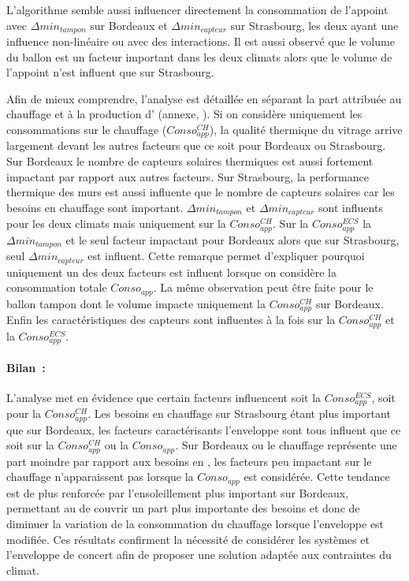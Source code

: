 L’algorithme semble aussi influencer directement la consommation de l’appoint avec
$\Delta min_{tampon}$ sur Bordeaux et $\Delta min_{capteur}$ sur Strasbourg, les deux
ayant une influence non-linéaire ou avec des interactions. Il est aussi observé que
le volume du ballon  est un facteur important dans les deux climats alors
que le volume de l’appoint n’est influent que sur Strasbourg.

Afin de mieux comprendre, l’analyse est détaillée en séparant la part attribuée au
chauffage et à la production d’ (annexe, ). Si on
considère uniquement les consommations sur le chauffage ($Conso_{app}^{CH}$), la qualité
thermique du vitrage arrive largement devant les autres facteurs que ce soit pour Bordeaux
ou Strasbourg. Sur Bordeaux le nombre de capteurs solaires thermiques est aussi fortement
impactant par rapport aux autres facteurs. Sur Strasbourg, la performance thermique des
murs est aussi influente que le nombre de capteurs solaires car les besoins en chauffage
sont important.
$\Delta min_{tampon}$ et $\Delta min_{capteur}$ sont influents pour les deux climats mais
uniquement sur la $Conso_{app}^{CH}$. Sur la $Conso_{app}^{ECS}$ la $\Delta min_{tampon}$
et le seul facteur impactant pour Bordeaux alors que sur Strasbourg, seul $\Delta
min_{capteur}$ est influent. Cette remarque permet d’expliquer pourquoi uniquement un des
deux facteurs est influent lorsque on considère la consommation totale $Conso_{app}$. La
même observation peut être faite pour le ballon tampon dont le volume impacte uniquement
la $Conso_{app}^{CH}$ sur Bordeaux. Enfin les caractéristiques des capteurs sont
influentes à la fois sur la $Conso_{app}^{CH}$ et la $Conso_{app}^{ECS}$.

\paragraph{Bilan~:} %
\label{par:bilan_conso_app}
L’analyse met en évidence que certain facteurs influencent soit la $Conso_{app}^{ECS}$,
soit pour la $Conso_{app}^{CH}$. Les besoins en chauffage sur Strasbourg étant plus
important que sur Bordeaux, les facteurs caractérisants l’enveloppe sont tous influent que
ce soit sur la $Conso_{app}^{CH}$ ou la $Conso_{app}$. Sur Bordeaux ou le chauffage
représente une part moindre par rapport aux besoins en , les facteurs peu
impactant sur le chauffage n’apparaissent pas lorsque la $Conso_{app}$ est considérée.
Cette tendance est de plus renforcée par l’ensoleillement plus important sur Bordeaux,
permettant au  de couvrir un part plus importante des besoins et donc de diminuer
la variation de la consommation du chauffage lorsque l’enveloppe est modifiée. Ces
résultats confirment la nécessité de considérer les systèmes et l’enveloppe de concert
afin de proposer une solution adaptée aux contraintes du climat.


